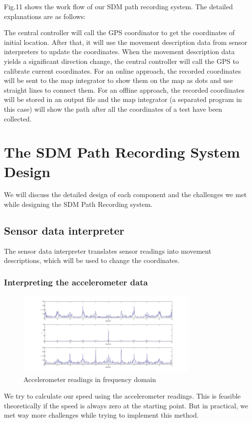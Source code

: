 \documentclass[journal]{IEEEtran}
\begin{document}
Fig.11 shows the work flow of our SDM path recording system.
The detailed explanations are as follows:

The central controller will call the GPS coordinator to get the coordinates of initial location.
After that, it will use the movement description data from sensor interpreters to update the coordinates.
When the movement description data yields a significant direction change, the central controller will call the GPS to calibrate current coordinates.
For an online approach, the recorded coordinates will be sent to the map integrator to show them on the map as dots and use straight lines to connect them.
For an offline approach, the recorded coordinates will be stored in an output file and the map integrator (a separated program in this case) will show the path after all the coordinates of a test have been collected.

\section{The SDM Path Recording System Design}
We will discuss the detailed design of each component and the challenges we met while designing the SDM Path Recording system.

\subsection{Sensor data interpreter}
The sensor data interpreter translates sensor readings into movement descriptions, which will be used to change the coordinates.

\subsubsection{Interpreting the accelerometer data}
\begin{figure}
	\centering
	\includegraphics[width=3.5in]{figures/AccFreq}
	\caption{Accelerometer readings in frequency domain}
\end{figure}

We try to calculate our speed using the accelerometer readings. 
This is feasible theoretically if the speed is always zero at the starting point. 
But in practical, we met way more challenges while trying to implement this method.
\end{document}
